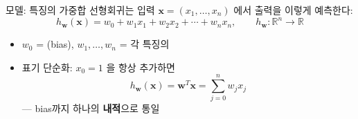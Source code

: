 \begin{frame}{모델: 특징의 가중합}
  선형회귀는 입력 $\boldsymbol{x} = (x_1, \ldots, x_n)$ 에서 출력을 이렇게 예측한다:
  \[
  h_{\boldsymbol{w}}(\boldsymbol{x}) = w_0 + w_1 x_1 + w_2 x_2 + \cdots + w_n x_n,
  \qquad h_{\boldsymbol{w}}: \mathbb{R}^n \to \mathbb{R}
  \]
  \begin{itemize}
    \item $w_0$ = (bias), \; $w_1, \ldots, w_n$ = 각 특징의 
    \item 표기 단순화: $x_0 = 1$ 을 항상 추가하면
      \[h_{\boldsymbol{w}}(\boldsymbol{x}) = \boldsymbol{w}^T \boldsymbol{x} = \sum_{j=0}^n w_j x_j\]
      --- bias까지 하나의 \textbf{내적}으로 통일
  \end{itemize}
\end{frame}
